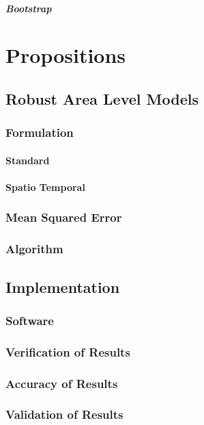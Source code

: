 \subsubsection{Bootstrap}



\part{Propositions}

\chapter{Robust Area Level Models}
\section{Formulation}
\subsection{Standard}
\subsection{Spatio Temporal}
\section{Mean Squared Error}
\section{Algorithm}



\chapter{Implementation}\label{part:implementation}
\section{Software}
\section{Verification of Results}
\section{Accuracy of Results}
\section{Validation of Results}

